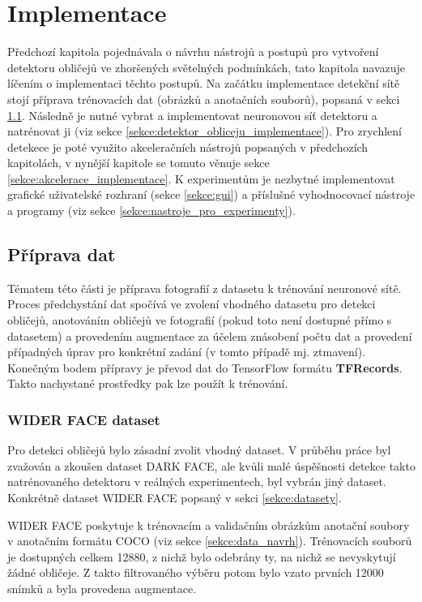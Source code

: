\chapter{Implementace}
\label{kapitola:implementace}
Předchozí kapitola pojednávala o návrhu nástrojů a postupů pro vytvoření detektoru obličejů ve zhoršených světelných podmínkách, tato kapitola navazuje líčením o implementaci těchto postupů. Na začátku implementace detekční sítě stojí příprava trénovacích dat (obrázků a anotačních souborů), popsaná v sekci \ref{sekce:priprava_dat}. Následně je nutné vybrat a implementovat neuronovou síť detektoru a natrénovat ji (viz sekce \ref{sekce:detektor_obliceju_implementace}). Pro zrychlení detekece je poté využito akceleračních nástrojů popsaných v předchozích kapitolách, v nynější kapitole se tomuto věnuje sekce \ref{sekce:akcelerace_implementace}. K experimentům je nezbytné implementovat grafické uživatelské rozhraní (sekce \ref{sekce:gui}) a příslušné vyhodnocovací nástroje a programy (viz sekce \ref{sekce:nastroje_pro_experimenty}).

\section{Příprava dat}
\label{sekce:priprava_dat}
Tématem této části je příprava fotografií z datasetu k trénování neuronové sítě. Proces předchystání dat spočívá ve zvolení vhodného datasetu pro detekci obličejů, anotováním obličejů ve fotografií (pokud toto není dostupné přímo s datasetem) a provedením augmentace za účelem znásobení počtu dat a provedení případných úprav pro konkrétní zadání (v tomto případě mj. ztmavení). Konečným bodem přípravy je převod dat do TensorFlow formátu \textbf{TFRecords}. Takto nachystané prostředky pak lze použít k trénování.

\subsection*{WIDER FACE dataset}
Pro detekci obličejů bylo zásadní zvolit vhodný dataset. V průběhu práce byl zvažován a zkoušen dataset DARK FACE, ale kvůli malé úspěšnosti detekce takto natrénovaného detektoru v reálných experimentech, byl vybrán jiný dataset. Konkrétně dataset WIDER FACE popsaný v sekci \ref{sekce:datasety}.

WIDER FACE poskytuje k trénovacím a validačním obrázkům anotační soubory v anotačním formátu COCO (viz sekce \ref{sekce:data_navrh}). Trénovacích souborů je dostupných celkem 12880, z nichž bylo odebrány ty, na nichž se nevyskytují žádné obličeje. Z takto filtrovaného výběru potom bylo vzato prvních 12000 snímků a byla provedena augmentace.

